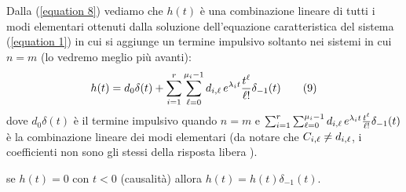 	\begin{osservazione}
		Dalla (\ref{equation 8}) vediamo che $ h(t) $ è una combinazione lineare di tutti i modi elementari ottenuti dalla soluzione dell'equazione caratteristica del sistema (\ref{equation 1}) in cui si aggiunge un termine impulsivo soltanto nei sistemi in cui $n=m$ (lo vedremo meglio più avanti):
		\begin{equation}
			 h(t)= d_0 \delta(t) + \sum_{i=1}^{r}\sum_{\ell=0}^{\mu_i-1}d_{i,\ell} \,e^{\lambda_it}\frac{t^\ell}{\ell!}\delta_{-1} (t)
			\tag{9}\label{equation 9}
		\end{equation}
		dove $ d_0 \delta(t) $ è il termine impulsivo quando $ n=m$ e $ \sum_{i=1}^{r}\sum_{\ell=0}^{\mu_i-1}d_{i,\ell} \,e^{\lambda_it}\frac{t^\ell}{\ell!}\delta_{-1} (t) $ è la combinazione lineare dei modi elementari (da notare che $C_{i,\ell}\neq d_{i,\ell} $, i coefficienti non sono gli stessi della risposta libera ).
	\end{osservazione}
	
	\begin{NB}
		se $h(t)=0 $ con $ t<0$ (causalità) allora $h(t) = h(t)\delta_{-1} (t)$.
	\end{NB}

